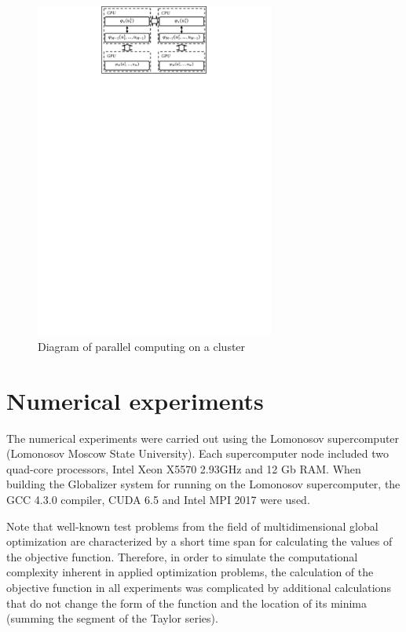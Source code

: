 \documentclass{svproc}
\begin{document}
   \begin{figure}[h!]
    \centering
		\includegraphics[width=0.7\textwidth]{Parallel_Computing.pdf}
		\caption{Diagram of parallel computing on a cluster}\label{fig:Parallel_Computing}
\end{figure}

\section{Numerical experiments}

The numerical experiments were carried out using the Lomonosov supercomputer (Lomonosov Moscow State University). Each supercomputer node included two quad-core processors, Intel Xeon X5570 2.93GHz and 12 Gb RAM. When building the Globalizer system for running on the Lomonosov supercomputer, the GCC 4.3.0 compiler, CUDA 6.5 and Intel MPI 2017 were used.

Note that well-known test problems from the field of multidimensional global optimization are characterized by a short time span for calculating the values of the objective function. Therefore, in order to simulate the computational complexity inherent in applied optimization problems, the calculation of the objective function in all experiments was complicated by additional calculations that do not change the form of the function and the location of its minima (summing the segment of the Taylor series).
\end{document}
